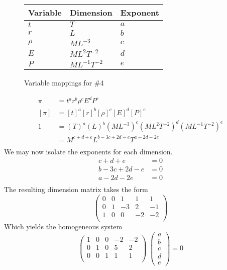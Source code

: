 \documentclass[12pt]{article}
\begin{document}
  \begin{figure}
    \centering
    \begin{tabularx}{0.5\textwidth}{XXX}
      Variable & Dimension & Exponent \\ \midrule
      $t$ & $T$ & $a$ \\
      $r$ & $L$ & $b$ \\
      $\rho$ & $ML^{-3}$ & $c$ \\
      $E$ & $ML^{2}T^{-2}$ & $d$ \\
      $P$ & $ML^{-1}T^{-2}$ & $e$ \\
    \end{tabularx}
    \caption{Variable mappings for \#4}
\label{fig:4-var-mappings}
  \end{figure}
  \begin{equation*}
    \begin{aligned}
      \pi &= {t}^a {r}^b {\rho}^c {E}^d {P}^e \\
      [\pi] &= {[t]}^a {[r]}^b {[\rho]}^c {[E]}^d {[P]}^e \\
      1 &= {(T)}^a{(L)}^b{(ML^{-3})}^c{(ML^2T^{-2})}^d{(ML^{-1}T^{-2})}^e \\
      &= M^{c+d+e}L^{b-3c+2d-e}T^{a-2d-2e} \\
    \end{aligned}
  \end{equation*}
  We may now isolate the exponents for each dimension.
  \begin{equation*}
    \begin{aligned}
      c + d + e &= 0 \\
      b - 3c + 2d - e &= 0 \\
      a - 2d - 2e &= 0 \\
    \end{aligned}
  \end{equation*}
  The resulting dimension matrix takes the form
  \begin{equation*}
    \begin{pmatrix}
      0 & 0 & 1 & 1 & 1 \\
      0 & 1 & -3 & 2 & -1 \\
      1 & 0 & 0 & -2 & -2 \\
    \end{pmatrix}
  \end{equation*}
  Which yields the homogeneous system
  \begin{equation*}
    \begin{pmatrix}
      1 & 0 & 0 & -2 & -2 \\
      0 & 1 & 0 & 5 & 2 \\
      0 & 0 & 1 & 1 & 1 \\
    \end{pmatrix} \;
    \begin{pmatrix}
      a \\ b \\ c \\ d \\ e
    \end{pmatrix}
    = 0
  \end{equation*}
\end{document}

